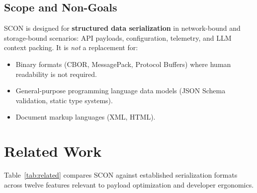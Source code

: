 \documentclass[11pt, a4paper]{article}
\begin{document}
\subsection{Scope and Non-Goals}

SCON is designed for \textbf{structured data serialization} in
network-bound and storage-bound scenarios: API payloads, configuration,
telemetry, and LLM context packing. It is \emph{not} a replacement for:

\begin{itemize}
\item Binary formats (CBOR, MessagePack, Protocol Buffers) where
      human readability is not required.
\item General-purpose programming language data models (JSON Schema
      validation, static type systems).
\item Document markup languages (XML, HTML).
\end{itemize}

\section{Related Work}
\label{sec:related}

Table~\ref{tab:related} compares SCON against established serialization
formats across twelve features relevant to payload optimization and
developer ergonomics.
\end{document}
